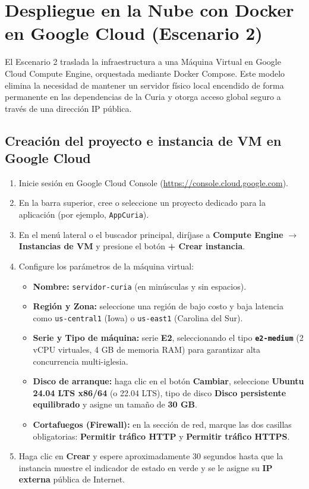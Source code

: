 \section{Despliegue en la Nube con Docker en Google Cloud (Escenario 2)}\label{sec:despliegue-cloud}
El Escenario 2 traslada la infraestructura a una Máquina Virtual en Google Cloud Compute Engine, orquestada mediante Docker Compose. Este modelo elimina la necesidad de mantener un servidor físico local encendido de forma permanente en las dependencias de la Curia y otorga acceso global seguro a través de una dirección IP pública.

\subsection{Creación del proyecto e instancia de VM en Google Cloud}
\begin{enumerate}
    \item Inicie sesión en Google Cloud Console (\url{https://console.cloud.google.com}).
    \item En la barra superior, cree o seleccione un proyecto dedicado para la aplicación (por ejemplo, \texttt{AppCuria}).
    \item En el menú lateral o el buscador principal, diríjase a \textbf{Compute Engine} $\rightarrow$ \textbf{Instancias de VM} y presione el botón \textbf{+ Crear instancia}.
    \item Configure los parámetros de la máquina virtual:
    \begin{itemize}
        \item \textbf{Nombre:} \texttt{servidor-curia} (en minúsculas y sin espacios).
        \item \textbf{Región y Zona:} seleccione una región de bajo costo y baja latencia como \texttt{us-central1} (Iowa) o \texttt{us-east1} (Carolina del Sur).
        \item \textbf{Serie y Tipo de máquina:} serie \textbf{E2}, seleccionando el tipo \textbf{\texttt{e2-medium}} (2 vCPU virtuales, 4 GB de memoria RAM) para garantizar alta concurrencia multi-iglesia.
        \item \textbf{Disco de arranque:} haga clic en el botón \textbf{Cambiar}, seleccione \textbf{Ubuntu 24.04 LTS x86/64} (o 22.04 LTS), tipo de disco \textbf{Disco persistente equilibrado} y asigne un tamaño de \textbf{30 GB}.
        \item \textbf{Cortafuegos (Firewall):} en la sección de red, marque las dos casillas obligatorias: \textbf{Permitir tráfico HTTP} y \textbf{Permitir tráfico HTTPS}.
    \end{itemize}
    \item Haga clic en \textbf{Crear} y espere aproximadamente 30 segundos hasta que la instancia muestre el indicador de estado en verde y se le asigne su \textbf{IP externa} pública de Internet.
\end{enumerate}

